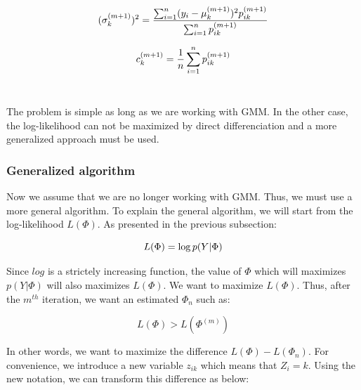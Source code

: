   \begin{equation*}
  (\sigma_k^{(m+1)})^2 = \frac{\sum_{i=1}^n (y_i-\mu_k^{(m+1)})^2p_{ik}^{(m+1)}}{\sum_{i=1}^n p_{ik}^{(m+1)}}\\
  \end{equation*}
  
  \begin{equation*}
  c_k^{(m+1)} = \frac{1}{n}\sum_{i=1}^n p_{ik}^{(m+1)}\\
  \end{equation*}
\\
\par
The problem is simple as long as we are working with GMM. In the other case, the log-likelihood can not be maximized by direct differenciation and a more generalized approach must be used.
%
\subsubsection{Generalized algorithm}
Now we assume that we are no longer working with GMM. Thus, we must use a more general algorithm. %
To explain the general algorithm, we will start from the log-likelihood $L(\Phi)$. As presented in the previous subsection:

  \begin{equation*}
  L(\Phi)=\operatorname*{log} p(Y|\Phi)\\
  \end{equation*}
 
Since $log$ is a strictely increasing function, the value of $\Phi$ which will maximizes  $p(Y|\Phi)$ will also maximizes $L(\Phi)$. We want to maximize $L(\Phi)$. Thus, after the $m^{th}$ iteration, we want an estimated $\Phi_n$ such as:

  \begin{equation*}
  L(\Phi)>L(\Phi^{(m)})
  \end{equation*}
 
In other words, we want to maximize the difference $L(\Phi)-L(\Phi_n)$. For convenience, we introduce a new variable $z_{ik}$ which means that $Z_i=k$. Using the new notation, we can transform this difference as below:

